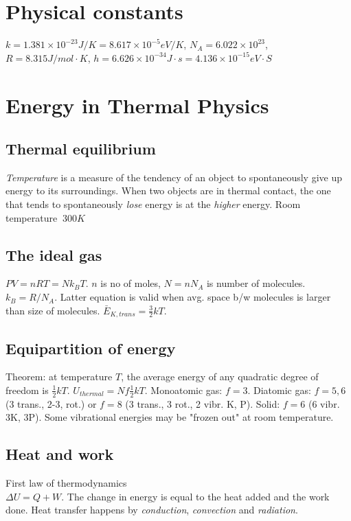 \documentclass[11pt,twocolumn]{amsart}
\begin{document}
\section{Physical constants}
$k=1.381\times10^{-23}J/K = 8.617\times10^{-5}eV/K$, $N_A = 6.022\times10^{23}$, $R=8.315 J/mol\cdot K$, $h=6.626\times10^{-34}J\cdot s = 4.136\times10^{-15}eV\cdot S$

\section{Energy in Thermal Physics}

\subsection{Thermal equilibrium}
\emph{Temperature} is a measure of the tendency of an object to spontaneously give up energy to its surroundings. When two objects are in thermal contact, the one that tends to spontaneously \emph{lose} energy is at the \emph{higher} energy. Room temperature $~300K$

\subsection{The ideal gas} $PV = nRT = Nk_BT$. $n$ is no of moles, $N=nN_A$ is number of molecules. $k_B = R/N_A$. Latter equation is valid when avg. space b/w molecules is larger than size of molecules. $\bar{E}_{K,trans} = \frac{3}{2}kT$.

\subsection{Equipartition of energy}
Theorem: at temperature $T$, the average energy of any quadratic degree of freedom is $\frac{1}{2}kT$. $U_{thermal} = Nf\frac{1}{2}kT$. Monoatomic gas: $f=3$. Diatomic gas: $f=5,6$ (3 trans., 2-3, rot.) or $f=8$ (3 trans., 3 rot., 2 vibr. K, P). Solid: $f=6$ (6 vibr. 3K, 3P). Some vibrational energies may be "frozen out" at room temperature.

\subsection{Heat and work}  
First law of thermodynamics \\$\Delta U = Q + W$. The change in energy is equal to the heat added and the work done. Heat transfer happens by \emph{conduction}, \emph{convection} and \emph{radiation}.
\end{document}
